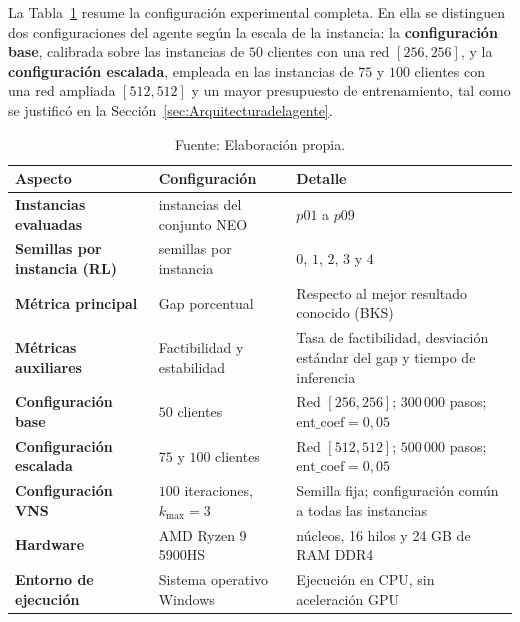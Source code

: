 La Tabla~\ref{tab:protocolo} resume la configuración experimental completa. En ella se distinguen dos configuraciones del agente según la escala de la instancia: la \textbf{configuración base}, calibrada sobre las instancias de $50$ clientes con una red $[256,256]$, y la \textbf{configuración escalada}, empleada en las instancias de $75$ y $100$ clientes con una red ampliada $[512,512]$ y un mayor presupuesto de entrenamiento, tal como se justificó en la Sección~\ref{sec:Arquitecturadelagente}.

\begin{table}[H]
    \centering
    \caption{\label{tab:protocolo} Protocolo experimental de la validación.}
    \caption*{Fuente: Elaboración propia.}
    \renewcommand{\arraystretch}{1.22}
    \setlength{\tabcolsep}{7pt}
    \begin{tabular}{
        @{}
        >{\raggedright\arraybackslash}p{3.7cm}
        >{\raggedright\arraybackslash}p{4.6cm}
        >{\raggedright\arraybackslash}p{5.2cm}
        @{}
    }
        \toprule
        \textbf{Aspecto} & \textbf{Configuración} & \textbf{Detalle} \\
        \midrule
        \textbf{Instancias evaluadas}
        & 9 instancias del conjunto NEO
        & $p01$ a $p09$ \\
        \midrule
        \textbf{Semillas por instancia (RL)}
        & 5 semillas por instancia
        & $0$, $1$, $2$, $3$ y $4$ \\
        \midrule
        \textbf{Métrica principal}
        & Gap porcentual
        & Respecto al mejor resultado conocido (BKS) \\
        \midrule
        \textbf{Métricas auxiliares}
        & Factibilidad y estabilidad
        & Tasa de factibilidad, desviación estándar del gap y tiempo de inferencia \\
        \midrule
        \textbf{Configuración base}
        & $50$ clientes
        & Red $[256,256]$; $300\,000$ pasos; $\text{ent\_coef}=0{,}05$ \\
        \midrule
        \textbf{Configuración escalada}
        & $75$ y $100$ clientes
        & Red $[512,512]$; $500\,000$ pasos; $\text{ent\_coef}=0{,}05$ \\
        \midrule
        \textbf{Configuración VNS}
        & $100$ iteraciones, $k_{\max}=3$
        & Semilla fija; configuración común a todas las instancias \\
        \midrule
        \textbf{Hardware}
        & AMD Ryzen 9 5900HS
        & 8 núcleos, 16 hilos y 24 GB de RAM DDR4 \\
        \midrule
        \textbf{Entorno de ejecución}
        & Sistema operativo Windows
        & Ejecución en CPU, sin aceleración GPU \\
        \bottomrule
    \end{tabular}
\end{table}

